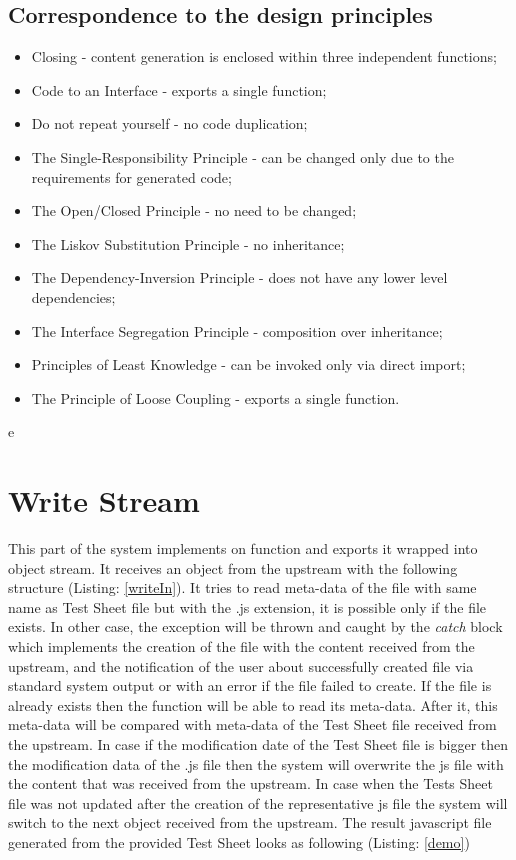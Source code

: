 {\subsection{Correspondence to the design principles}
\begin{itemize}
	\item Closing - content generation is enclosed within three independent functions;
	\item Code to an Interface - exports a single function;
	\item Do not repeat yourself - no code duplication;
	\item The Single-Responsibility Principle - can be changed only due to the requirements for generated code;
	\item The Open/Closed Principle - no need to be changed;
	\item The Liskov Substitution Principle - no inheritance;
	\item The Dependency-Inversion Principle - does not have any lower level dependencies;
	\item The Interface Segregation Principle - composition over inheritance;
	\item Principles of Least Knowledge - can be invoked only via direct import;
	\item The Principle of Loose Coupling - exports a single function.
\end{itemize}

e\section{Write Stream}
\label{sec:write}
This part of the system implements on function and exports it wrapped into object stream. It receives an object from the upstream with the following structure (Listing: \ref{writeIn}). It tries to read meta-data of the file with same name as Test Sheet file but with the .js extension, it is possible only if the file exists. In other case, the exception will be thrown and caught by the \textit{ catch} block which implements the creation of the file with the content received from the upstream, and the notification of the user about successfully created file via standard system output or with an error if the file failed to create. If the  file is already exists then the function will be able to read its meta-data. After it, this meta-data will be compared with meta-data of the Test Sheet file received from the upstream. In case if the modification date of the Test Sheet file is bigger then the modification data of the  .js file then the system will overwrite the js file with the content that was received from the upstream. In case when the Tests Sheet file was not updated after the creation of the representative js file the system will switch to the next object received from the upstream. The result javascript file generated from the provided Test Sheet looks as following (Listing: \ref{demo})

}
